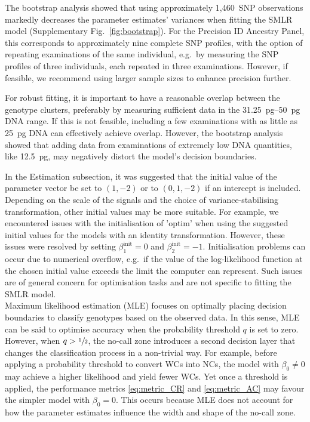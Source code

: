 \documentclass[preprint,5p,times,11pt]{elsarticle}
\begin{document}
The bootstrap analysis showed that using approximately 1,460~SNP observations markedly decreases the parameter estimates' variances when fitting the SMLR model (Supplementary Fig.~\ref{fig:bootstrap}).
For the Precision ID Ancestry Panel, this corresponds to approximately nine complete SNP profiles, with the option of repeating examinations of the same individual, e.g.~by measuring the SNP profiles of three individuals, each repeated in three examinations.
However, if feasible, we recommend using larger sample sizes to enhance precision further.

For robust fitting, it is important to have a reasonable overlap between the genotype clusters, preferably by measuring sufficient data in the \SIrange[range-units = single, range-phrase = --]{31.25}{50}{\pg} DNA range.
If this is not feasible, including a few examinations with as little as \SI{25}{\pg} DNA can effectively achieve overlap.
However, the bootstrap analysis showed that adding data from examinations of extremely low DNA quantities, like \SI{12.5}{\pg}, may negatively distort the model's decision boundaries.

In the Estimation subsection, it was suggested that the initial value of the parameter vector be set to $(1, -2)$ or to $(0, 1, -2)$ if an intercept is included.
Depending on the scale of the signals and the choice of variance-stabilising transformation, other initial values may be more suitable.
For example, we encountered issues with the initialisation of 'optim' when using the suggested initial values for the models with an identity transformation.
However, these issues were resolved by setting $\beta_1^{\text{init}} = 0$ and $\beta_2^{\text{init}} = -1$.
Initialisation problems can occur due to numerical overflow, e.g.~if the value of the log-likelihood function at the chosen initial value exceeds the limit the computer can represent.
Such issues are of general concern for optimisation tasks and are not specific to fitting the SMLR model.\\


Maximum likelihood estimation (MLE) focuses on optimally placing decision boundaries to classify genotypes based on the observed data.
In this sense, MLE can be said to optimise accuracy when the probability threshold $q$ is set to zero.
However, when $q > \sfrac{1}{2}$, the no-call zone introduces a second decision layer that changes the classification process in a non-trivial way.
For example, before applying a probability threshold to convert WCs into NCs, the model with $\beta_0 \neq 0$ may achieve a higher likelihood and yield fewer WCs.
Yet once a threshold is applied, the performance metrics \eqref{eq:metric_CR} and \eqref{eq:metric_AC} may favour the simpler model with $\beta_0 = 0$.
This occurs because MLE does not account for how the parameter estimates influence the width and shape of the no-call zone.
\end{document}
